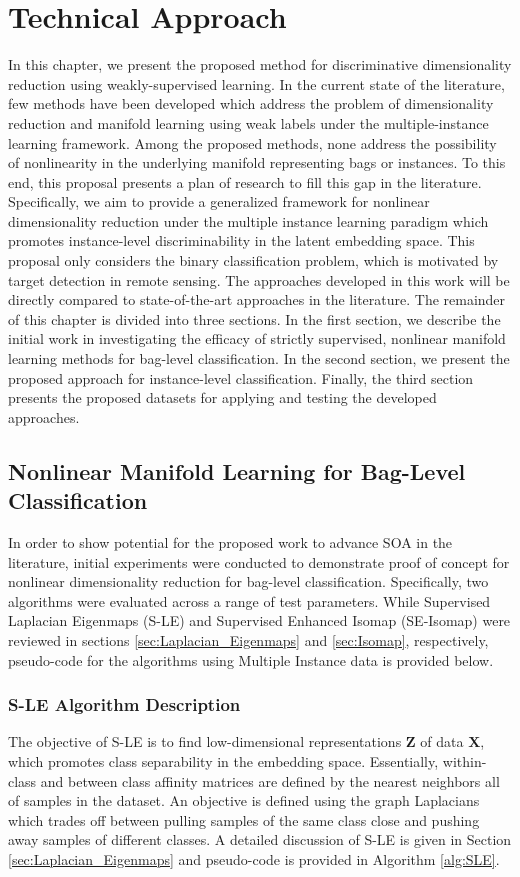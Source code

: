 \chapter{Technical Approach}
In this chapter, we present the proposed method for discriminative dimensionality reduction using weakly-supervised learning. In the current state of the literature, few methods have been developed which address the problem of dimensionality reduction and manifold learning using weak labels under the multiple-instance learning framework.  Among the proposed methods, none address the possibility of nonlinearity in the underlying manifold representing bags or instances. To this end, this proposal presents a plan of research to fill this gap in the literature.  Specifically, we aim to provide a generalized framework for nonlinear dimensionality reduction under the multiple instance learning paradigm which promotes instance-level discriminability in the latent embedding space.  This proposal only considers the binary classification problem, which is motivated by target detection in remote  sensing. The approaches developed in this work will be directly compared to state-of-the-art approaches in the literature.  The remainder of this chapter is divided into three sections.  In the first section, we describe the initial work in investigating the efficacy of strictly supervised, nonlinear manifold learning methods for bag-level classification.  In the second section, we present the proposed approach for instance-level classification.  Finally, the third section presents the proposed datasets for applying and testing the developed approaches. 

\section{Nonlinear Manifold Learning for Bag-Level Classification}
In order to show potential for the proposed work to advance SOA in the literature, initial experiments were conducted to demonstrate proof of concept for nonlinear dimensionality reduction for bag-level classification.  Specifically, two algorithms were evaluated across a range of test parameters.  While Supervised Laplacian Eigenmaps (S-LE) and Supervised Enhanced Isomap (SE-Isomap) were reviewed in sections \ref{sec:Laplacian_Eigenmaps} and \ref{sec:Isomap}, respectively, pseudo-code for the algorithms using Multiple Instance data is provided below.  

\subsection{S-LE Algorithm Description}
The objective of S-LE \citep{Raducanu2012SupervisedNonlinearDimReduction} is to find low-dimensional representations $\bm{Z}$ of data $\bm{X}$, which promotes class separability in the embedding space.  Essentially, within-class and between class affinity matrices are defined by the nearest neighbors all of samples in the dataset.  An objective is defined using the graph Laplacians  which trades off between pulling samples of the same class close and pushing away samples of different classes.   A detailed discussion of S-LE is given in Section \ref{sec:Laplacian_Eigenmaps} and pseudo-code is provided in Algorithm \ref{alg:SLE}.

